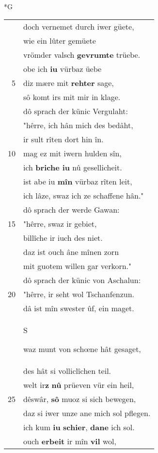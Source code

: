 \documentclass[8pt,a4paper,notitlepage]{article}
\begin{document}
\begin{table}[ht]
\begin{minipage}[t]{0.5\linewidth}
\small
\begin{center}*G
\end{center}
\begin{tabular}{rl}
 & doch vernemet durch iwer güete,\\ 
 & wie ein lûter gemüete\\ 
 & vrömder valsch \textbf{gevrumte} trüebe.\\ 
 & obe ich \textbf{iu} vürbaz üebe\\ 
5 & diz mære mit \textbf{rehter} sage,\\ 
 & sô komt irs mit mir in klage.\\ 
 & dô sprach der künic Vergulaht:\\ 
 & "hêrre, ich hân mich des bedâht,\\ 
 & ir sult rîten dort hin în.\\ 
10 & mag ez mit iwern hulden sîn,\\ 
 & ich \textbf{briche iu} nû gesellicheit.\\ 
 & ist abe iu \textbf{mîn} vürbaz rîten leit,\\ 
 & ich lâze, swaz ich ze schaffene hân."\\ 
 & dô sprach der werde Gawan:\\ 
15 & "hêrre, swaz ir gebiet,\\ 
 & billîche ir iuch des niet.\\ 
 & daz ist ouch âne mînen zorn\\ 
 & mit guotem willen gar verkorn."\\ 
 & dô sprach der künic von Aschalun:\\ 
20 & "hêrre, ir seht wol Tschanfenzun.\\ 
 & dâ ist mîn swester ûf, ein maget.\\ 
 & \begin{large}S\end{large}waz munt von schœne hât gesaget,\\ 
 & des hât si volliclîchen teil.\\ 
 & welt ir\textbf{z} \textbf{nû} prüeven vür ein heil,\\ 
25 & dêswâr, \textbf{sô} muoz si sich bewegen,\\ 
 & daz si iwer unze ane mich sol pflegen.\\ 
 & ich kum \textbf{iu} \textbf{schier}, \textbf{dane} ich sol.\\ 
 & ouch \textbf{erbeit} ir mîn \textbf{vil} wol,\\ 

\end{tabular}
\end{minipage}
\end{table}
\end{document}
